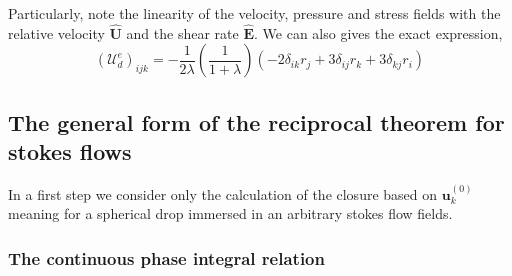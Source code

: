 Particularly, note the linearity of the velocity, pressure and stress fields with the relative velocity $\hat{\textbf{U}}$ and the shear rate $\hat{\textbf{E}}$. 
We can also gives the exact expression, 
\begin{equation*}
    (\mathcal{U}_d^e)_{ijk} 
    = 
    - \frac{1}{2\lambda}\left(\frac{1}{1+\lambda}\right)(-2 \delta_{ik} r_j + 3\delta_{ij} r_k + 3\delta_{kj} r_i) 
\end{equation*}

\subsection{The general form of the reciprocal theorem for stokes flows}

In a first step we consider only the calculation of the closure based on $\textbf{u}^{(0)}_k$ meaning for a spherical drop immersed in an arbitrary stokes flow fields. 

\subsubsection{The continuous phase integral relation}

